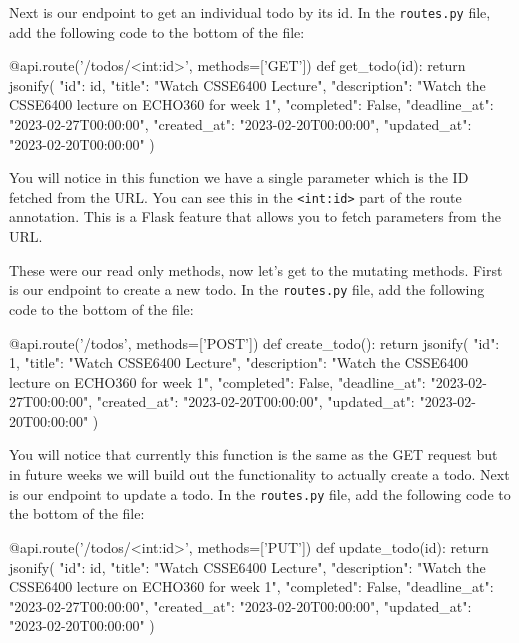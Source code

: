 \documentclass{csse4400}
\begin{document}
Next is our endpoint to get an individual todo by its id. In the \texttt{routes.py} file, add the following code to the bottom of the file:

\begin{code}[language=python]{}
  @api.route('/todos/<int:id>', methods=['GET'])
  def get_todo(id):
      return jsonify({
        "id": id,
        "title": "Watch CSSE6400 Lecture",
        "description": "Watch the CSSE6400 lecture on ECHO360 for week 1",
        "completed": False,
        "deadline_at": "2023-02-27T00:00:00",
        "created_at": "2023-02-20T00:00:00",
        "updated_at": "2023-02-20T00:00:00"
      })
\end{code}

You will notice in this function we have a single parameter which is the ID fetched from the URL. You can see this in the \texttt{<int:id>} part of the route annotation. This is a Flask feature that allows you to fetch parameters from the URL. 

These were our read only methods, now let's get to the mutating methods. First is our endpoint to create a new todo. In the \texttt{routes.py} file, add the following code to the bottom of the file:

\begin{code}[language=python]{}
  @api.route('/todos', methods=['POST'])
  def create_todo():
      return jsonify({
        "id": 1,
        "title": "Watch CSSE6400 Lecture",
        "description": "Watch the CSSE6400 lecture on ECHO360 for week 1",
        "completed": False,
        "deadline_at": "2023-02-27T00:00:00",
        "created_at": "2023-02-20T00:00:00",
        "updated_at": "2023-02-20T00:00:00"
      })
\end{code}

You will notice that currently this function is the same as the GET request but in future weeks we will build out the functionality to actually create a todo. Next is our endpoint to update a todo. In the \texttt{routes.py} file, add the following code to the bottom of the file:

\begin{code}[language=python]{}
  @api.route('/todos/<int:id>', methods=['PUT'])
  def update_todo(id):
      return jsonify({
        "id": id,
        "title": "Watch CSSE6400 Lecture",
        "description": "Watch the CSSE6400 lecture on ECHO360 for week 1",
        "completed": False,
        "deadline_at": "2023-02-27T00:00:00",
        "created_at": "2023-02-20T00:00:00",
        "updated_at": "2023-02-20T00:00:00"
      })
\end{code}
\end{document}
